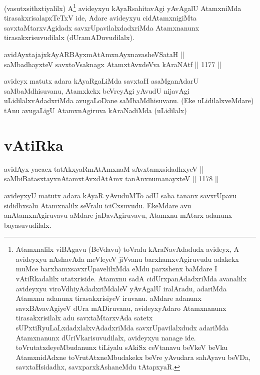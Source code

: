 \begin{artha}
(vasutxsithxtiyalilx) A\footnote{Atamxnalilx viBAgavu (BeVdavu) toVralu kAraNavAdadudx avideyx, A avideyxyu nAshavAda meVleyeV jiVvanu barxhamxvAgiruvudu adakekx muMce barxhamxsavxrUpavelilxMda eMdu parxshenx baMdare I vAtiRkadalilx utatxriside. Atamxnu sadA cidUrxpanAdadxriMda avanalilx avideyxyu viroVdhiyAdadxriMdaleV yAvAgalU iralAradu, adariMda Atamxnu adanunx tirasakxrisiyeV iruvanu. aMdare adanunx savxBAvavAgiyeV dUra mADiruvanu, avideyxyAdaro Atamxnanunx tirasakxrisilalx adu savxtaMtarxvAda satetx sUPxtiRyuLaLxdadxlalxvAdadxriMda savxrUpavilalxdudx adariMda Atamxnanunx dUriVkarisuvudilalx, avideyxyu nanage ide. toVrutatxdeyeMbudanunx tiLiyalu sAkiSx ceVtanavu beVkeV beVku AtamxnidAdxne toVrutAtxneMbudakekx beVre yAvudara sahAyavu beVDa, savxtaHsidadhx, savxparxkAshaneMdu tAtapxyaR.} avideyxyu kAyaRsahitavAgi yAvAgalU AtamxniMda tirasakxrisalapxTeTxV ide, Adare avideyxyu cidAtamxnigiMta savxtaMtarxvAgidadx savxrUpavilalxdadxriMda Atamxnanunx tirasakxrisuvudilalx (dUramADuvudilalx).
\end{artha}


\begin{shl}
avidAyxtajajxkAyARBAyxmAtAmx\s nAyxnavasheVSataH || \\
saMbadhayxteV savxtoV\s saknagx AtamxtAvxdeVva kAraNAtf \hfill || 1177 ||  
\end{shl}

\begin{artha}
avideyx matutx adara kAyaRgaLiMda savxtaH asaMganAdarU saMbaMdhisuvanu, Atamxkekx beVreyAgi yAvudU nijavAgi uLidilalxvAdadxriMda avugaLoDane saMbaMdhisuvanu. (Eke uLidilalxveMdare) tAnu avugaLigU AtamxnAgiruva kAraNadiMda (uLidilalx)
\end{artha}

\section*{vAtiRka}

\begin{shl}
avidAyx yacacx tatAkxyaRmAtAmxnaM sAvxtamxsidadhxyeV ||  \\
saMbiBatasxtayxnAtamxtAvxdAtAmx tanAnxnumanayxteV \hfill || 1178 ||  
\end{shl}

\begin{artha}
avideyxyU matutx adara kAyaR yAvuduMTo adU saha tananx savxrUpavu sididhxsalu Atamxnalilx seVralu iciCxsuvudu. EkeMdare avu anAtamxnAgiruvavu aMdare jaDavAgiruvavu, Atamxnu mAtarx adanunx bayasuvudilalx.
\end{artha}

